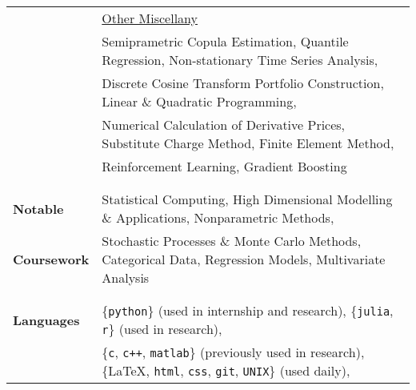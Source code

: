 \documentclass[utf8,letterpaper,oneside]{article}
\begin{document}
\begin{center}
\begin{tabular}{l l}
                           & \underline{Other Miscellany}                                                                                                                     \\
                           & Semiprametric Copula Estimation, Quantile Regression, Non-stationary Time Series Analysis,                                                       \\
                           & Discrete Cosine Transform Portfolio Construction, Linear \& Quadratic Programming,                                                               \\
                           & Numerical Calculation of Derivative Prices, Substitute Charge Method, Finite Element Method,                                                     \\
                           & {Reinforcement Learning}, {Gradient Boosting}                                                                                                    \\
                           &                                                                                                                                                  \\ \hline
                           &                                                                                                                                                  \\
  \textbf{Notable}         & Statistical Computing, {High Dimensional} Modelling \& Applications, {Nonparametric} Methods,                                                    \\
  \textbf{Coursework}      & Stochastic Processes \& Monte Carlo Methods, Categorical Data, Regression Models, Multivariate Analysis                                          \\
                           &                                                                                                                                                  \\ \hline
                           &                                                                                                                                                  \\
  \textbf{Languages}       & \{{\texttt{python}}\} (used in internship and research), \{{\texttt{julia}, \texttt{r}}\} (used in research),                                    \\ &\{{\texttt{c}, \texttt{c++}}, \texttt{matlab}\} (previously used in research), \{\LaTeX, \texttt{html}, \texttt{css}, {\texttt{git}}, \texttt{UNIX}\} (used daily),                  \\

\end{tabular}
\end{center}
\end{document}

